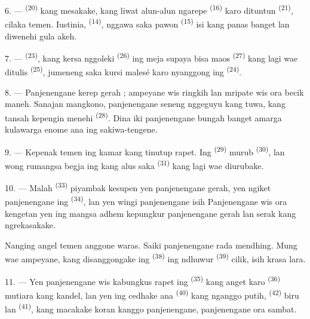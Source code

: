 \VUsaut{4.2mm}
\VUsaut{3.0mm}

6. ---  \textsuperscript{(20)} kang mesakake, kang
liwat alun-alun ngarepe  \textsuperscript{(16)} karo
dituntun  \textsuperscript{(21)}, cilaka temen.
Iustinia,  \textsuperscript{(14)}, nggawa saka pawon
 \textsuperscript{(15)} isi  kang panas
banget lan diwenehi gula akeh.

7. ---  \textsuperscript{(23)}, kang kersa nggoleki
 \textsuperscript{(26)} ing meja supaya bisa
maos  \textsuperscript{(27)} kang lagi wae ditulis
 \textsuperscript{(25)}, jumeneng saka kursi malesé karo
nyanggong ing  \textsuperscript{(24)}.

8. --- Panjenengane kerep gerah  ; ampeyane wis ringkih lan mripate wis ora becik maneh.
Sanajan mangkono, panjenengane seneng nggeguyu  kang
tuwa, kang tansah kepengin menehi 
\textsuperscript{(28)}. Dina iki panjenengane bungah banget amarga
kulawarga enome ana ing sakiwa-tengene.

9. --- Kepenak temen ing kamar kang tinutup rapet. Ing  \textsuperscript{(29)} murub 
\textsuperscript{(30)}, lan wong rumangsa begja ing 
kang alus saka  \textsuperscript{(31)} kang lagi wae
diurubake.

\VUsaut{4.2mm}
\VUsaut{3.0mm}

10. --- Malah  \textsuperscript{(33)} piyambak
kesupen yen panjenengane gerah, yen  ngiket
panjenengane ing  \textsuperscript{(34)}, lan yen
wingi panjenengane isih 
Panjenengane wis ora kengetan yen ing mangsa adhem kepungkur
panjenengane gerah  lan  serak kang
ngrekasakake.

Nanging angel temen anggone waras. Saiki panjenengane rada mendhing.
Mung wae ampeyane, kang disanggongake ing 
\textsuperscript{(38)} ing ndhuwur 
\textsuperscript{(39)} cilik, isih krasa lara.

11. --- Yen panjenengane wis kabungkus rapet ing  \textsuperscript{(35)} kang anget karo 
\textsuperscript{(36)} mutiara kang kandel, lan yen ing cedhake ana
 \textsuperscript{(40)} kang nganggo
 putih,  \textsuperscript{(42)} biru lan
 \textsuperscript{(41)}, kang macakake koran
kanggo panjenengane, panjenengane ora sambat.

